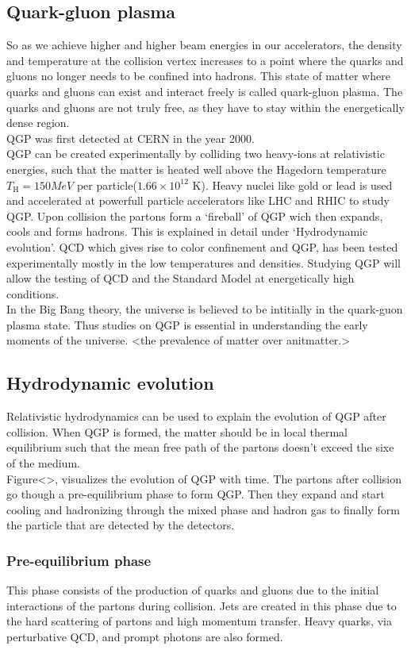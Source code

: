 \documentclass[12pt,a4paper,twoside]{report}
\begin{document}
\subsection{Quark-gluon plasma}
So as we achieve higher and higher beam energies in our accelerators, the density and temperature at the collision vertex increases to a point where the quarks and gluons no longer needs to be confined into hadrons. This state of matter where quarks and gluons can exist and interact freely is called quark-gluon plasma. The quarks and gluons are not truly free, as they have to stay within the energetically dense region.\\
QGP was first detected at CERN in the year 2000.\\
QGP can be created experimentally by colliding two heavy-ions at relativistic energies, such that the matter is heated well above the Hagedorn temperature $T_\mathrm{H}=150MeV$ per particle($1.66\times10^{12}$ K). Heavy nuclei like gold or lead is used and accelerated at powerfull particle accelerators like LHC and RHIC to study QGP. Upon collision the partons form a `fireball' of QGP wich then expands, cools and forms hadrons. This is explained in detail under `Hydrodynamic evolution'.
QCD which gives rise to color confinement and QGP, has been tested experimentally mostly in the low temperatures and densities. Studying QGP will allow the testing of QCD and the Standard Model at energetically high conditions.\\
In the Big Bang theory, the universe is believed to be intitially in the quark-guon plasma state. Thus studies on QGP is essential in understanding the 
early moments of the universe. <the prevalence of matter over anitmatter.>
\subsection{Hydrodynamic evolution}
Relativistic hydrodynamics can be used to explain the evolution of QGP after collision. When QGP is formed, the matter should be in local thermal equilibrium such that the mean free path of the partons doesn't exceed the sixe of the medium.\\
Figure<>, visualizes the evolution of QGP with time. The partons after collision go though a pre-equilibrium phase to form QGP. Then they expand and start cooling and hadronizing through the mixed phase and hadron gas to finally form the particle that are detected by the detectors.
\subsubsection{Pre-equilibrium phase}
This phase consists of the production of quarks and gluons due to the initial interactions of the partons during collision. Jets are created in this phase due to the hard scattering of partons and high momentum transfer. Heavy quarks, via perturbative QCD, and prompt photons are also formed.
\end{document}
